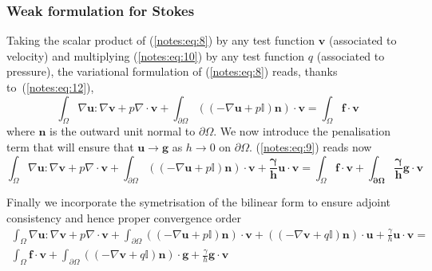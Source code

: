 \subsubsection{Weak formulation for Stokes}
  Taking the scalar product of (\ref{notes:eq:8}) by any test function
  $\mathbf{v}$ (associated to velocity) and multiplying (\ref{notes:eq:10})
  by any test function $q$ (associated to pressure), the variational
  formulation of (\ref{notes:eq:8}) reads, thanks to~(\ref{notes:eq:12}),
  \begin{equation}
    \label{notes:eq:9}
    \int_\Omega \nabla \mathbf{u} \colon \nabla \mathbf{v} +  p \nabla \cdot \mathbf{v} + \int_{\partial \Omega} ( (-\nabla \mathbf{u} + p\mathbb{I}) \mathbf{n}) \cdot \mathbf{v} = \int_\Omega \mathbf{f} \cdot \mathbf{v}
  \end{equation}
  where $\mathbf{n}$ is the outward unit normal to $\partial
  \Omega$. We now introduce the penalisation term that will ensure
  that $\mathbf{u} \rightarrow \mathbf{g}$ as $h \rightarrow 0$ on $\partial \Omega$. (\ref{notes:eq:9}) reads now
  \begin{equation}
    \label{notes:eq:14}
    \int_\Omega \nabla \mathbf{u} \colon \nabla \mathbf{v} +  p \nabla \cdot \mathbf{v} + \int_{\partial \Omega} ((-\nabla \mathbf{u} + p\mathbb{I}) \mathbf{n})\cdot \mathbf{v} + \mathbf{\frac{\gamma}{h} \mathbf{u}\cdot \mathbf{v}}  = \int_\Omega \mathbf{f} \cdot \mathbf{v} + \mathbf{\int_{\partial \Omega} \frac{\gamma}{h} \mathbf{g} \cdot \mathbf{v}}
  \end{equation}

  Finally we incorporate the symetrisation of the bilinear form to ensure adjoint consistency and hence proper convergence order
  \begin{equation}
    \label{notes:eq:15}
    \begin{split}
      \int_\Omega \nabla \mathbf{u} \colon \nabla \mathbf{v} +  p \nabla \cdot \mathbf{v} +
      \int_{\partial \Omega} ((-\nabla \mathbf{u} + p\mathbb{I}) \mathbf{n})\cdot \mathbf{v} + ((-\nabla \mathbf{v} + q\mathbb{I}) \mathbf{n})\cdot \mathbf{u} + \frac{\gamma}{h} \mathbf{u}\cdot \mathbf{v} = \\
      \int_\Omega \mathbf{f} \cdot \mathbf{v} + \int_{\partial \Omega} ((-\nabla \mathbf{v} + q\mathbb{I}) \mathbf{n})\cdot \mathbf{g} + \frac{\gamma}{h} \mathbf{g} \cdot \mathbf{v}
    \end{split}
  \end{equation}


